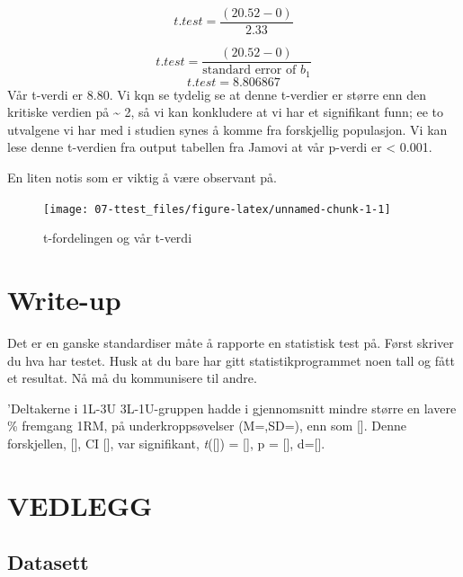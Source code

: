 \documentclass[
]{book}
\begin{document}
\[
t.test = \frac{(20.52 - 0)}{2.33}
\]

\[
t.test = \frac{(20.52 - 0)}{\text{standard error of } b_1}
\]
\[
t.test = 8.806867
\]
Vår t-verdi er 8.80. Vi kqn se tydelig se at denne t-verdier er større enn den kritiske verdien på \textasciitilde{} 2, så vi kan konkludere at vi har et signifikant funn; ee to utvalgene vi har med i studien synes å komme fra forskjellig populasjon. Vi kan lese denne t-verdien fra output tabellen fra Jamovi at vår p-verdi er \textless{} 0.001.

En liten notis som er viktig å være observant på.

\begin{figure}

{\centering \texttt{[image: 07-ttest\_files/figure-latex/unnamed-chunk-1-1]} 

}

\caption{t-fordelingen og vår t-verdi}\label{fig:unnamed-chunk-1}
\end{figure}

\hypertarget{write-up}{%
\chapter{Write-up}\label{write-up}}

Det er en ganske standardiser måte å rapporte en statistisk test på. Først skriver du hva har testet. Husk at du bare har gitt statistikprogrammet noen tall og fått et resultat. Nå må du kommunisere til andre.

'Deltakerne i 1L-3U 3L-1U-gruppen hadde i gjennomsnitt mindre større en lavere \% fremgang 1RM, på underkroppsøvelser (M=,SD=), enn som {[}{]}. Denne forskjellen, {[}{]}, CI {[}{]}, var signifikant, \emph{t}({[}{]}) = {[}{]}, p = {[}{]}, d={[}{]}.

\hypertarget{vedlegg}{%
\chapter{VEDLEGG}\label{vedlegg}}

\hypertarget{datasett-1}{%
\section{Datasett}\label{datasett-1}}
\end{document}
